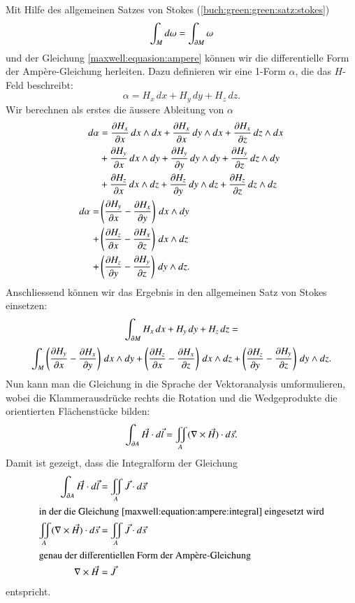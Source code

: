 Mit Hilfe des allgemeinen Satzes von Stokes (\ref{buch:green:green:satz:stokes})
\[
\int_{M} d\omega
=
\int_{\d M} \omega
\]
und der Gleichung \eqref{maxwell:equasion:ampere} können wir die differentielle Form der Ampère-Gleichung herleiten.
Dazu definieren wir eine 1-Form $\alpha$, die das $H$-Feld beschreibt:
\[
\alpha
=
H_x \, dx + H_y \, dy + H_z \, dz . 
\]
Wir berechnen als erstes die äussere Ableitung von $\alpha$
\begin{align*}
	d\alpha 
	&=
	\frac{\d H_x}{\d x} \, dx \wedge dx + \frac{\d H_x}{\d x} \, dy \wedge dx + \frac{\d H_x}{\d z} \, dz \wedge dx
	\\
	&+
	\frac{\d H_y}{\d x} \, dx \wedge dy + \frac{\d H_y}{\d y} \, dy \wedge dy + \frac{\d H_y}{\d z} \, dz \wedge dy
	\\
	&+
	\frac{\d H_z}{\d x} \, dx \wedge dz + \frac{\d H_z}{\d y} \, dy \wedge dz + \frac{\d H_z}{\d z} \, dz \wedge dz
	\\
	d\alpha
	=
	&\left(\frac{\d H_y}{\d x} - \frac{\d H_x}{\d y}\right) \, dx \wedge dy
	\\
	+
	&\left(\frac{\d H_z}{\d x} - \frac{\d H_x}{\d z}\right) \, dx \wedge dz
	\\
	+
	&\left(\frac{\d H_z}{\d y} - \frac{\d H_y}{\d z}\right) \, dy \wedge dz .
\end{align*}
Anschliessend können wir das Ergebnis in den allgemeinen Satz von Stokes einsetzen:
\[
\int_{\d M} H_x \, dx + H_y \, dy + H_z \, dz
=
\]
\[
\int_{M} \left(\frac{\d H_y}{\d x} - \frac{\d H_x}{\d y}\right) \, dx \wedge dy
+
\left(\frac{\d H_z}{\d x} - \frac{\d H_x}{\d z}\right) \, dx \wedge dz
+
\left(\frac{\d H_z}{\d y} - \frac{\d H_y}{\d z}\right) \, dy \wedge dz .
\]
Nun kann man die Gleichung in die Sprache der Vektoranalysis umformulieren, wobei die Klammerausdrücke rechts die Rotation und die Wedgeprodukte die orientierten Flächenstücke bilden: 
\begin{equation}
\label{maxwell:equation:ampere:integral}
\int_{\d A} \vec{H} \cdot d\vec{l}
=
\iint_{A} (\nabla \times \vec{H}) \cdot d\vec{s} .
\end{equation}
Damit ist gezeigt, dass die Integralform der Gleichung
\begin{align}
	\int_{\d A}
	\vec{H} \cdot d\vec{l}
	&=
	\iint_{A}
	\vec{J} \cdot d\vec{s}
	\notag
	\\
	\intertext{in der die Gleichung \eqref{maxwell:equation:ampere:integral} eingesetzt wird}
	\iint_{A}
	(
	\nabla \times \vec{H}
	)
	\cdot
	d\vec{s}
	&=
	\iint_{A}
	\vec{J} \cdot d\vec{s}
	\label{maxwell:equation:ampere:differential}
	\\
	\intertext{genau der differentiellen Form der Ampère-Gleichung}
	\nabla \times \vec{H}
	&=
	\vec{J} 
\end{align}
entspricht.

